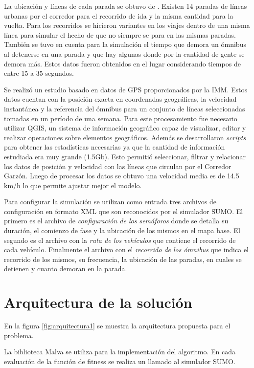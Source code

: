 La ubicación y líneas de cada parada se obtuvo de \citep{sigMontevideo}. Existen 14 paradas de líneas urbanas por el corredor para el recorrido de ida y la misma cantidad para la vuelta. Para los recorridos se hicieron  variantes  en  los  viajes  dentro  de  una  misma línea para simular el hecho de que no siempre se para en las mismas paradas. También se tuvo en cuenta para la simulación el tiempo que demora un ómnibus al detenerse en una parada y que hay algunas donde por la cantidad de gente se demora más. Estos datos fueron obtenidos en el lugar considerando tiempos de entre 15 a 35 segundos.

Se realizó un estudio basado en datos de GPS proporcionados por la IMM. Estos datos cuentan con la posición exacta en coordenadas geográficas, la velocidad instantánea y la referencia del ómnibus para un conjunto de líneas seleccionadas tomadas en un período de una semana. 
Para este procesamiento fue necesario utilizar QGIS, un sistema de información geográfico capaz de visualizar, editar y realizar operaciones sobre elementos geográficos. Además se desarrollaron \emph{scripts} para obtener las estadísticas necesarias ya que la cantidad de información estudiada era muy grande (1.5Gb). Esto permitió seleccionar, filtrar y relacionar los datos de posición y velocidad con las líneas que circulan por el Corredor Garzón. Luego de procesar los datos se obtuvo una velocidad media es de 14.5 km/h lo que permite ajustar mejor el modelo. 

Para configurar la simulación se utilizan como entrada tres archivos de configuración en formato XML que son reconocidos por el simulador SUMO. El primero es el archivo de \emph{configuración de los semáforos} donde se detalla su duración, el comienzo de fase y la ubicación de los mismos en el mapa base. El segundo es el archivo con la \emph{ruta de los vehículos} que contiene el recorrido de cada vehículo. Finalmente el archivo con el \emph{recorrido de los ómnibus} que indica el recorrido de los mismos, su frecuencia, la ubicación de las paradas, en cuales se detienen y cuanto demoran en la parada.

\section{Arquitectura de la solución}

En la figura \ref{fig:arquitectura1} se muestra la arquitectura propuesta para el problema.

La biblioteca Malva se utiliza para la implementación del algoritmo. En cada evaluación de la función de fitness se realiza un llamado al simulador SUMO. 

